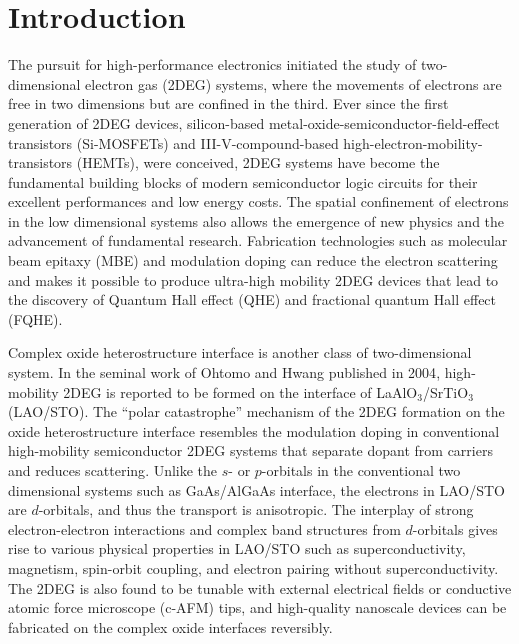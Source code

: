 \documentclass[pdflatex, sectionletters, 12pt]{pittetd}    %
\begin{document}
\chapter{Introduction}%
\label{SEC:introduction}

The pursuit for high-performance electronics initiated the study of two-dimensional electron gas (2DEG) systems, where the movements of electrons are free in two dimensions but are confined in the third. Ever since the first generation of 2DEG devices, silicon-based metal-oxide-semiconductor-field-effect transistors (Si-MOSFETs) and III-V-compound-based high-electron-mobility-transistors (HEMTs), were conceived, 2DEG systems have become the fundamental building blocks of modern semiconductor logic circuits for their excellent performances and low energy costs\cite{vinet2017cmos}. The spatial confinement of electrons in the low dimensional systems also allows the emergence of new physics and the advancement of fundamental research. Fabrication technologies such as molecular beam epitaxy (MBE) and modulation doping\cite{dingle1979high} can reduce the electron scattering and makes it possible to produce ultra-high mobility 2DEG devices that lead to the discovery of Quantum Hall effect (QHE)\cite{klitzing1980new} and fractional quantum Hall effect (FQHE)\cite{chang1983fractional}.

Complex oxide heterostructure interface is another class of two-dimensional system. In the seminal work of Ohtomo and Hwang published in 2004\cite{ohtomo2004high}, high-mobility 2DEG is reported to be formed on the interface of LaAlO$_3$/SrTiO$_3$ (LAO/STO). The ``polar catastrophe'' mechanism\cite{nakagawa2006some} of the 2DEG formation on the oxide heterostructure interface resembles the modulation doping in conventional high-mobility semiconductor 2DEG systems that separate dopant from carriers and reduces scattering\cite{bogorin2010laalo3}. Unlike the $s$- or $p$-orbitals in the conventional two dimensional systems such as GaAs/AlGaAs interface, the electrons in LAO/STO are $d$-orbitals\cite{salluzzo2009orbital}, and thus the transport is anisotropic\cite{annadi2013anisotropic}. The interplay of strong electron-electron interactions\cite{hwang2012emergent} and complex band structures from $d$-orbitals\cite{salluzzo2009orbital} gives rise to various physical properties in LAO/STO such as superconductivity\cite{reyren2007superconducting}, magnetism\cite{brinkman2007magnetic}, spin-orbit coupling\cite{caviglia2010tunable}, and electron pairing without superconductivity\cite{cheng2015electron}. The 2DEG is also found to be tunable with external electrical fields\cite{thiel2006tunable} or conductive atomic force microscope (c-AFM) tips\cite{cen2008nanoscale}, and high-quality nanoscale devices can be fabricated on the complex oxide interfaces reversibly\cite{cen2009oxide, irvin2010rewritable, cheng2011sketched, jnawali2015photoconductive, tomczyk2016micrometer, jiang2017direct, chen2019over}.
\end{document}
